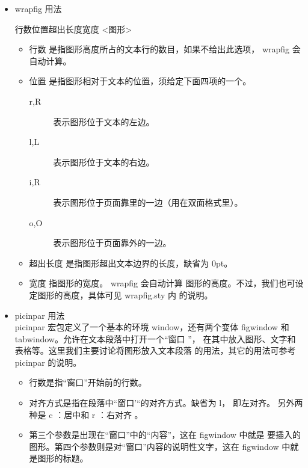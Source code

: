 \begin{itemize}
  \item wrapfig 用法
  \begin{texinlist}
\begin{wrapfigure}{行数}{位置}{超出长度}{宽度}
  <图形>
\end{wrapfigure}
  \end{texinlist}
  \begin{itemize}
    \item 行数
    是指图形高度所占的文本行的数目，如果不给出此选项， wrapfig 会自动计算。
    \item 位置
    是指图形相对于文本的位置，须给定下面四项的一个。 
    \begin{description}
      \item[r,R] 表示图形位于文本的左边。
      \item[l,L] 表示图形位于文本的右边。
      \item[i,R] 表示图形位于页面靠里的一边（用在双面格式里）。
      \item[o,O] 表示图形位于页面靠外的一边。
    \end{description}
    \item 超出长度
    是指图形超出文本边界的长度，缺省为 0pt。 
    \item 宽度
    指图形的宽度。 wrapfig 会自动计算 图形的高度。不过，我们也可设定图形的高度，具体可见 wrapfig.sty 内 的说明。
  \end{itemize}
  \item picinpar 用法 \\
  picinpar 宏包定义了一个基本的环境 window，还有两个变体  figwindow 和 tabwindow。允许在文本段落中打开一个``窗口 ''， 在其中放入图形、文字和表格等。这里我们主要讨论将图形放入文本段落 的用法，其它的用法可参考 picinpar 的说明。  
  \begin{texinlist}
\begin{window} \end{window}
\begin{figwindow} [行数，对齐方式，图形，标题]\end{figwindow}
  \end{texinlist}
  \begin{itemize}
    \item 行数是指“窗口”开始前的行数。 
    \item 对齐方式是指在段落中“窗口'“的对齐方式。缺省为 l， 即左对齐。 另外两种是 c ：居中和 r ：右对齐 。
    \item 第三个参数是出现在“窗口”中的“内容”，这在 figwindow 中就是 要插入的图形。第四个参数则是对``窗口''内容的说明性文字，这在  figwindow 中就是图形的标题。
  \end{itemize}
\end{itemize}


